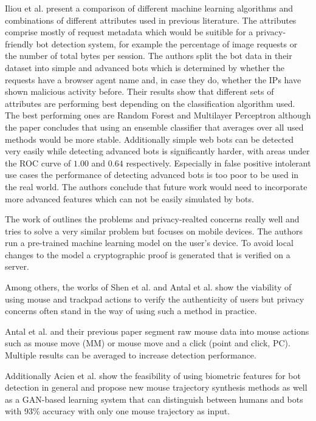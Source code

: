 \documentclass[
    fontsize=12pt,
    headings=small,
    parskip=half,           %
    bibliography=totoc,
    numbers=noenddot,       %
    open=any,               %
    final                   %
]{scrreprt}
\begin{document}
Iliou et al. \cite{10.1145/3339252.3339267} present a comparison of different machine learning algorithms and combinations of different attributes used in previous literature. The attributes comprise mostly of request metadata which would be suitible for a privacy-friendly bot detection system, for example the percentage of image requests or the number of total bytes per session. The authors split the bot data in their dataset into simple and advanced bots which is determined by whether the requests have a browser agent name and, in case they do, whether the IPs have shown malicious activity before. Their results show that different sets of attributes are performing best depending on the classification algorithm used. The best performing ones are Random Forest and Multilayer Perceptron although the paper concludes that using an ensemble classifier that averages over all used methods would be more stable. Additionally simple web bots can be detected very easily while detecting advanced bots is significantly harder, with areas under the ROC curve of $1.00$ and $0.64$ respectively. Especially in false positive intolerant use cases the performance of detecting advanced bots is too poor to be used in the real world. The authors conclude that future work would need to incorporate more advanced features which can not be easily simulated by bots.

The work of \cite{PETS2021} outlines the problems and privacy-realted concerns really well and tries to solve a very similar problem but focuses on mobile devices. The authors run a pre-trained machine learning model on the user's device. To avoid local changes to the model a cryptographic proof is generated that is verified on a server.

Among others, the works of Shen et al. \cite{6263955} and Antal et al. \cite{9111596} \cite{DBLP:journals/corr/abs-1810-04668} show the viability of using mouse and trackpad actions to verify the authenticity of users but privacy concerns often stand in the way of using such a method in practice.

Antal et al.\cite{9111596} and their previous paper\cite{DBLP:journals/corr/abs-1810-04668} segment raw mouse data into mouse actions such as mouse move (MM) or mouse move and a click (point and click, PC). Multiple results can be averaged to increase detection performance. 

Additionally Acien et al. \cite{Acien2020BeCAPTCHAMouseSM} show the feasibility of using biometric features for bot detection in general and propose new mouse trajectory synthesis methods as well as a GAN-based learning system that can distinguish between humans and bots with 93\% accuracy with only one mouse trajectory as input.
\end{document}
